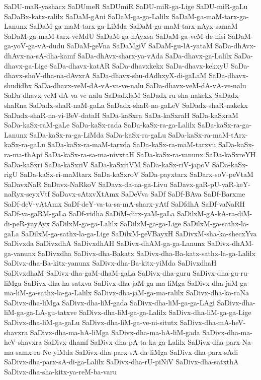 {SaDU-maR-yashacx
SaDUmeR
SaDUmiR
SaDU-miR-ga-Lige
SaDU-miR-gaLu
SaDaBx-katx-ralilx
SaDaM-gAni
SaDaM-ga-ga-Lalilx
SaDaM-ga-maM-tarx-ga-Lanunx
SaDaM-ga-maM-tarx-ga-LiMda
SaDaM-ga-maM-tarx-nAyx-samaM
SaDaM-ga-maM-tarx-veMdU
SaDaM-ga-nAyxsa
SaDaM-ga-veM-de-nisi
SaDaM-ga-yoV-ga-vA-dudu
SaDaM-geVna
SaDaMgiV
SaDaM-gu-lA-yataM
SaDa-dhAvx-dhAvx-na-sA-dha-kamf
SaDa-dhAvx-sharx-ya-vAda
SaDa-dhavx-ga-Lalilx
SaDa-dhavx-ga-Lige
SaDa-dhavx-katAR
SaDa-dhavxkekx
SaDa-dhavx-kekxyU
SaDa-dhavx-shoV-dha-na-dAvxrA
SaDa-dhavx-shu-dAdhxyX-di-gaLaM
SaDa-dhavx-shudidhx
SaDa-dhavx-veM-dA-vA-va-ve-nalu
SaDa-dhavx-veM-dA-vA-ve-nalu
SaDa-dhavx-veM-dA-va-ve-nalu
SaDadxlaM
SaDadx-ru-sha-nakekx
SaDadx-shaRna
SaDadx-shaR-naM-gaLa
SaDadx-shaR-na-gaLeV
SaDadx-shaR-nakekx
SaDadx-shaR-na-vi-BeV-dataH
SaDa-kaSxra
SaDa-kaSxraH
SaDa-kaSxraM
SaDa-kaSx-raM-gaLe
SaDa-kaSx-rada
SaDa-kaSx-ra-ga-Lalilx
SaDa-kaSx-ra-ga-Lanunx
SaDa-kaSx-ra-ga-LiMda
SaDa-kaSx-ra-gaLu
SaDa-kaSx-ra-maM-tArx-kaSx-ra-gaLu
SaDa-kaSx-ra-maM-tarxda
SaDa-kaSx-ra-maM-tarxvu
SaDa-kaSx-ra-ma-thApi
SaDa-kaSx-ra-sa-ma-nivxtaH
SaDa-kaSx-ra-vanunx
SaDa-kaSxreYH
SaDa-kaSxri
SaDa-kaSxriV
SaDa-kaSxriVM
SaDa-kaSx-riV-japoV
SaDa-kaSx-rigU
SaDa-kaSx-ri-maMtarx
SaDa-kaSxroV
SaDa-payxtarx
SaDarx-soV-peVtaM
SaDavxNaR
SaDavx-NaRkoV
SaDavx-da-na-ga-Livu
SaDavx-gaR-pU-vaR-keY-naRyx-seyxVtf
SaDavx-sAtxvXtAmx
SaDeVva
SaDf
SaDf-BAva
SaDf-Barxme
SaDf-deV-vAtAmx
SaDf-deY-va-ta-sa-mA-sharx-yAtf
SaDfdhA
SaDf-vaNaRH
SaDf-va-gaRM-gaLa
SaDf-vidha
SaDiM-dirx-yaM-gaLa
SaDilxM-gA-kA-ra-diM-di-peR-yayAyx
SaDilxM-ga-ga-Lalilx
SaDilxM-ga-ga-Lige
SaDilxM-ga-sathx-la-gaLa
SaDilxM-ga-sathx-la-ga-Lige
SaDilxM-geVBayxH
SaDivxM-sha-ka-shecxYva
SaDivxda
SaDivxdhA
SaDivxdhAH
SaDivx-dhAM-ga-ga-Lanunx
SaDivx-dhAM-ga-vanunx
SaDivxdha
SaDivx-dha-Bakatx
SaDivx-dha-Ba-katx-sathx-la-ga-Lalilx
SaDivx-dha-Ba-kitx-yanunx
SaDivx-dha-Ba-kitx-yiMda
SaDivxdhaH
SaDivxdhaM
SaDivx-dha-gaM-dhaM-gaLa
SaDivx-dha-guru
SaDivx-dha-gu-ru-liMga
SaDivx-dha-ha-satxva
SaDivx-dha-jaM-ga-ma-liMga
SaDivx-dha-jaM-ga-ma-liM-ga-sathx-la-ga-Lalilx
SaDivx-dha-jaM-ga-ma-ralilx
SaDivx-dha-ka-raNa
SaDivx-dha-liMga
SaDivx-dha-liM-gada
SaDivx-dha-liM-ga-ga-LAgi
SaDivx-dha-liM-ga-ga-LA-gu-tatxve
SaDivx-dha-liM-ga-ga-Lalilx
SaDivx-dha-liM-ga-ga-Lige
SaDivx-dha-liM-ga-gaLu
SaDivx-dha-liM-ga-ve-ni-situtx
SaDivx-dha-mA-heV-shavxra
SaDivx-dha-ma-hA-liMga
SaDivx-dha-ma-hA-liM-gada
SaDivx-dha-ma-heV-shavxra
SaDivx-dhamf
SaDivx-dha-pA-ta-ka-ga-Lalilx
SaDivx-dha-parx-Na-ma-samx-ra-Ne-yiMda
SaDivx-dha-parx-sA-da-liMga
SaDivx-dha-parx-sAdi
SaDivx-dha-parx-sA-di-ga-Lalilx
SaDivx-dha-rU-piNiV
SaDivx-dha-satxthA
SaDivx-dha-sha-kitx-ya-reM-ba-varu
}
